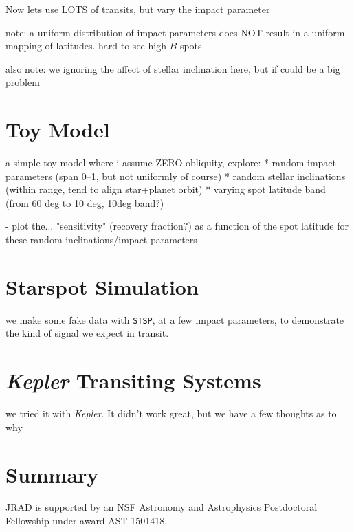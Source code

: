 \documentclass[preprint2]{aastex61}
\newcommand{\Kepler}{\textsl{Kepler}\xspace}
\begin{document}
Now lets use LOTS of transits, but vary the impact parameter

note: a uniform distribution of impact parameters does NOT result in a uniform mapping of latitudes. hard to see high-$B$ spots.

also note: we ignoring the affect of stellar inclination here, but if could be a big problem




\section{Toy Model}
a simple toy model where i assume ZERO obliquity, explore:
* random impact parameters (span 0--1, but not uniformly of course)
* random stellar inclinations (within range, tend to align star+planet orbit)
* varying spot latitude band (from 60 deg to 10 deg, 10deg band?)

- plot the... "sensitivity" (recovery fraction?) as a function of the spot latitude for these random inclinations/impact parameters


\section{Starspot Simulation}
we make some fake data with {\tt STSP}, at a few impact parameters, to demonstrate the kind of signal we expect in transit.


\section{\Kepler Transiting Systems}
we tried it with \Kepler. It didn't work great, but we have a few thoughts as to why




\section{Summary}
\label{sec:summary}


\acknowledgments

JRAD is supported by an NSF Astronomy and Astrophysics Postdoctoral Fellowship under award AST-1501418. 



\end{document}
